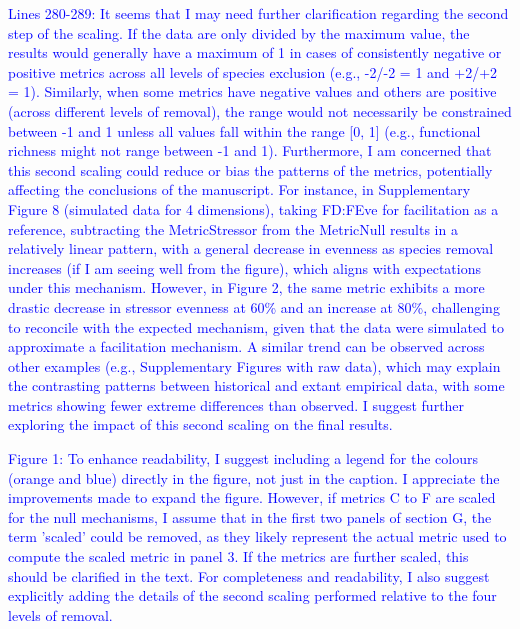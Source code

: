 \documentclass[
]{article}
\begin{document}
\textcolor{blue}{Lines 280-289: It seems that I may need further clarification regarding the second step of the scaling.
If the data are only divided by the maximum value, the results would generally have a maximum of 1 in cases of consistently negative or positive metrics across all levels of species exclusion (e.g., -2/-2 = 1 and +2/+2 = 1).
Similarly, when some metrics have negative values and others are positive (across different levels of removal), the range would not necessarily be constrained between -1 and 1 unless all values fall within the range [0, 1] (e.g., functional richness might not range between -1 and 1).
Furthermore, I am concerned that this second scaling could reduce or bias the patterns of the metrics, potentially affecting the conclusions of the manuscript.
For instance, in Supplementary Figure 8 (simulated data for 4 dimensions), taking FD:FEve for facilitation as a reference, subtracting the MetricStressor from the MetricNull results in a relatively linear pattern, with a general decrease in evenness as species removal increases (if I am seeing well from the figure), which aligns with expectations under this mechanism.
However, in Figure 2, the same metric exhibits a more drastic decrease in stressor evenness at 60\% and an increase at 80\%, challenging to reconcile with the expected mechanism, given that the data were simulated to approximate a facilitation mechanism.
A similar trend can be observed across other examples (e.g., Supplementary Figures with raw data), which may explain the contrasting patterns between historical and extant empirical data, with some metrics showing fewer extreme differences than observed.
I suggest further exploring the impact of this second scaling on the final results.}


\textcolor{blue}{Figure 1: To enhance readability, I suggest including a legend for the colours (orange and blue) directly in the figure, not just in the caption.
I appreciate the improvements made to expand the figure.
However, if metrics C to F are scaled for the null mechanisms, I assume that in the first two panels of section G, the term 'scaled' could be removed, as they likely represent the actual metric used to compute the scaled metric in panel 3.
If the metrics are further scaled, this should be clarified in the text.
For completeness and readability, I also suggest explicitly adding the details of the second scaling performed relative to the four levels of removal.}
\end{document}
